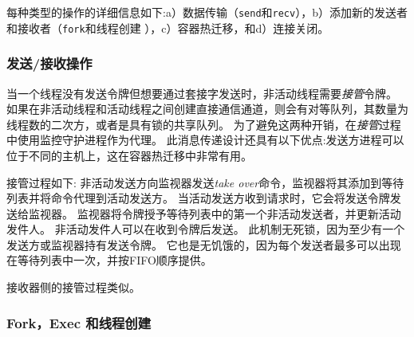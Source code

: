 
每种类型的操作的详细信息如下:a）数据传输（\texttt {send}和\texttt {recv}），b）添加新的发送者和接收者（\texttt {fork}和线程创建 ），c）容器热迁移，和d）连接关闭。

\subsubsection{发送/接收操作}
\label{socksdirect:subsubsec:fork_rdwr}


当一个线程没有发送令牌但想要通过套接字发送时，非活动线程需要\emph {接管}令牌。
如果在非活动线程和活动线程之间创建直接通信通道，则会有对等队列，其数量为线程数的二次方，或者是具有锁的共享队列。
为了避免这两种开销，在\emph {接管}过程中使用监控守护进程作为代理。
此消息传递设计还具有以下优点:发送方进程可以位于不同的主机上，这在容器热迁移中非常有用。

接管过程如下:
非活动发送方向监视器发送\emph {take over}命令，监视器将其添加到等待列表并将命令代理到活动发送方。
当活动发送方收到请求时，它会将发送令牌发送给监视器。
监视器将令牌授予等待列表中的第一个非活动发送者，并更新活动发件人。
非活动发件人可以在收到令牌后发送。
此机制无死锁，因为至少有一个发送方或监视器持有发送令牌。
它也是无饥饿的，因为每个发送者最多可以出现在等待列表中一次，并按FIFO顺序提供。

接收器侧的接管过程类似。



\subsubsection{Fork，Exec 和线程创建}
\label{socksdirect:subsubsec:fork_fork}


